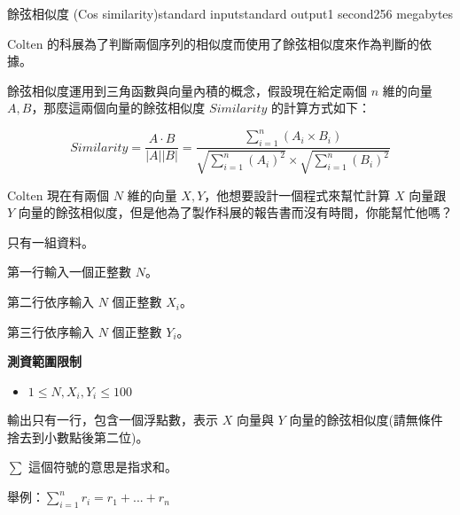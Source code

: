 \begin{problem}{餘弦相似度 (Cos similarity)}{standard input}{standard output}{1 second}{256 megabytes}

Colten 的科展為了判斷兩個序列的相似度而使用了餘弦相似度來作為判斷的依據。

餘弦相似度運用到三角函數與向量內積的概念，假設現在給定兩個 $n$ 維的向量 $A,B$，那麼這兩個向量的餘弦相似度 $Similarity$ 的計算方式如下：

$$Similarity =  \frac{A \cdot B}{|A||B|} = \frac{\sum\limits_{i=1}^{n}{(A_i \times B_i)} }{\sqrt{\sum\limits_{i=1}^{n}{(A_i)^2}} \times \sqrt{\sum\limits_{i=1}^{n}{(B_i)^2}}  }$$

Colten 現在有兩個 $N$ 維的向量 $X,Y$，他想要設計一個程式來幫忙計算 $X$ 向量跟 $Y$ 向量的餘弦相似度，但是他為了製作科展的報告書而沒有時間，你能幫忙他嗎？



\InputFile
只有一組資料。

第一行輸入一個正整數 $N$。

第二行依序輸入 $N$ 個正整數 $X_i$。

第三行依序輸入 $N$ 個正整數 $Y_i$。

\textbf{測資範圍限制}

\begin{itemize}

\item $1 \le N,X_i,Y_i \le 100$

\end{itemize}

\OutputFile
輸出只有一行，包含一個浮點數，表示 $X$ 向量與 $Y$ 向量的餘弦相似度(請無條件捨去到小數點後第二位)。

\Example

\begin{example}
%
\end{example}

\Note
$\sum$ 這個符號的意思是指求和。

舉例：$\sum\limits_{i=1}^{n}{r_i} =r_1 + ... + r_n$

\end{problem}

